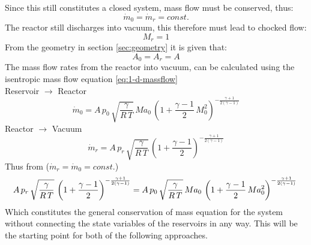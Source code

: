 	\noindent Since this still constitutes a closed system, mass flow must be conserved, thus:
	$$
		\dot{m}_0 = \dot{m}_r = const.
	$$
	The reactor still discharges into vacuum, this therefore must lead to chocked flow:
	$$
		M_r = 1
	$$
	From the geometry in section \ref{sec:geometry} it is given that:
	$$
		A_0 = A_r = A
	$$
	The mass flow rates from the reactor into vacuum, can be calculated using the isentropic mass flow equation \eqref{eq:1-d-massflow}\\
	Reservoir $\to$ Reactor
	\begin{equation}
		\dot{m}_0 = A\, p_0\, \sqrt{\frac{\gamma}{R\,T}}\, Ma_0\,\left(1+\frac{\gamma-1}{2}\,M_0^2\right)^{-\frac{\gamma+1}{2(\gamma-1)}}
		\label{eq:massflow-inlet}
	\end{equation}
	Reactor $\to$ Vacuum
	\begin{equation}
		\dot{m}_r = A\, p_r\, \sqrt{\frac{\gamma}{R\,T}}\,\left(1+\frac{\gamma-1}{2}\right)^{-\frac{\gamma+1}{2(\gamma-1)}}
		\label{eq:massflow-outlet}
	\end{equation}
	Thus from ($\dot{m}_r = \dot{m}_0 = const.$)
	$$
		A\, p_r\, \sqrt{\frac{\gamma}{R\,T}}\,\left(1+\frac{\gamma-1}{2}\right)^{-\frac{\gamma+1}{2(\gamma-1)}}
		=  A\, p_0\, \sqrt{\frac{\gamma}{R\,T}}\, Ma_0\,\left(1+\frac{\gamma-1}{2}\,Ma_0^2\right)^{-\frac{\gamma+1}{2(\gamma-1)}}\\\\
	$$
	Which constitutes the general conservation of mass equation for the system without connecting the state variables of the reservoirs in any way.
	This will be the starting point for both of the following approaches.\\
	\newpage
